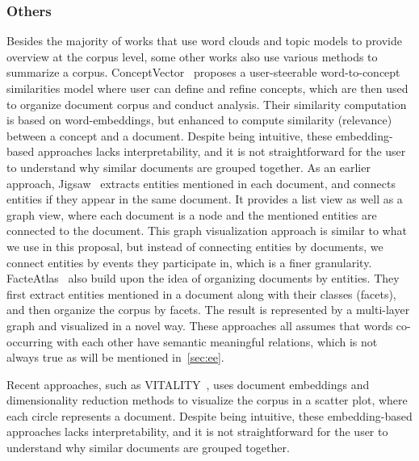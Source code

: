 \subsubsection{Others}
Besides the majority of works that use word clouds and topic models to provide overview at the corpus level,
some other works also use various methods to summarize a corpus.
ConceptVector~\cite{park2017conceptvector} proposes a user-steerable word-to-concept similarities model where user can define and refine concepts, which are then used to organize document corpus and conduct analysis.
Their similarity computation is based on word-embeddings, but enhanced to compute similarity (relevance) between a concept and a document.
Despite being intuitive, these embedding-based approaches lacks interpretability, and it is not straightforward for the user to understand why similar documents are grouped together.
As an earlier approach, Jigsaw~\cite{stasko2007jigsaw} extracts entities mentioned in each document, and connects entities if they appear in the same document.
It provides a list view as well as a graph view, where each document is a node and the mentioned entities are connected to the document.
This graph visualization approach is similar to what we use in this proposal, but instead of connecting entities by documents, we connect entities by events they participate in, which is a finer granularity.
FacteAtlas~\cite{cao2010facetatlas} also build upon the idea of organizing documents by entities.
They first extract entities mentioned in a document along with their classes (facets), and then organize the corpus by facets. 
The result is represented by a multi-layer graph and visualized in a novel way.
These approaches all assumes that words co-occurring with each other have semantic meaningful relations, which is not always true as will be mentioned in~\autoref{sec:ee}.

Recent approaches, such as VITALITY~\cite{Narechania2022VITALITY}, uses document embeddings and dimensionality reduction methods to visualize the corpus in a scatter plot, where each circle represents a document.
Despite being intuitive, these embedding-based approaches lacks interpretability, and it is not straightforward for the user to understand why similar documents are grouped together.

